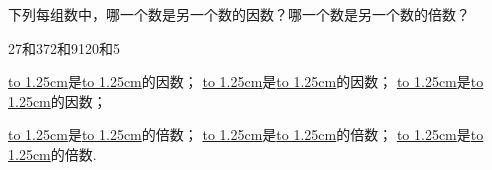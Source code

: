 下列每组数中，哪一个数是另一个数的因数？哪一个数是另一个数的倍数？

\hspace{1.5cm}27和3\hspace{4.5cm}72和9\hspace{4.5cm}120和5

\underline{\hbox to 1.25cm{}}是\underline{\hbox to 1.25cm{}}的因数；\hspace{1cm}
\underline{\hbox to 1.25cm{}}是\underline{\hbox to 1.25cm{}}的因数；\hspace{1cm}
\underline{\hbox to 1.25cm{}}是\underline{\hbox to 1.25cm{}}的因数；

\underline{\hbox to 1.25cm{}}是\underline{\hbox to 1.25cm{}}的倍数；\hspace{1cm}
\underline{\hbox to 1.25cm{}}是\underline{\hbox to 1.25cm{}}的倍数；\hspace{1cm}
\underline{\hbox to 1.25cm{}}是\underline{\hbox to 1.25cm{}}的倍数.